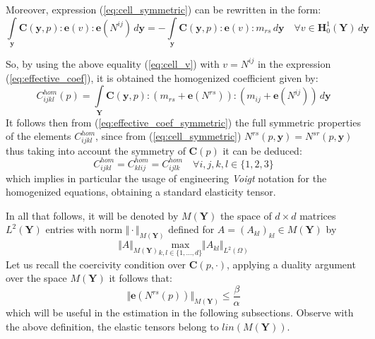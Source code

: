 Moreover, expression (\ref{eq:cell_symmetric}) can be rewritten in the form:
\begin{equation}
    \label{eq:cell_v}
    \int\limits_{\mathbf{y}}\mathbf{C}(\mathbf{y},p):\mathbf{e}(v): \mathbf{e}(N^{ij}) \, d\mathbf{y} = - \int\limits_{\mathbf{y}} \mathbf{C}(\mathbf{y},p):\mathbf{e}(v):m_{rs}\, d\mathbf{y} \quad \forall v \in \mathbf{H}^1_{0}(\mathbf{Y}) \, d\mathbf{y}
\end{equation}

So, by using the above equality (\ref{eq:cell_v}) with $v = N^{ij}$ in the expression (\ref{eq:effective_coef}), it is obtained the homogenized coefficient given by:
\begin{equation}
    \label{eq:effective_coef_symmetric}
    C_{ijkl}^{hom}(p) = \int\limits_{\mathbf{Y}} \mathbf{C}(\mathbf{y},p):(m_{rs}+\mathbf{e}(N^{rs})):(m_{ij}+\mathbf{e}(N^{ij})) \, d\mathbf{y}
\end{equation}
It follows then from (\ref{eq:effective_coef_symmetric}) the full symmetric properties of the elements $C^{hom}_{ijkl}$, since from (\ref{eq:cell_symmetric}) $N^{rs}(p,\mathbf{y}) = N^{sr}(p, \mathbf{y})$ thus taking into account the symmetry of $\mathbf{C}(p)$ it can be deduced:
\begin{equation*}
    C^{hom}_{ijkl} = C^{hom}_{klij} = C^{hom}_{ijlk} \quad \forall i,j,k,l \in \{1,2,3\}
\end{equation*}
which implies in particular the usage of engineering \textit{Voigt} notation for the homogenized equations, obtaining a standard elasticity tensor.

In all that follows, it will be denoted by $M(\mathbf{Y})$ the space of $d \times d$ matrices $L^2(\mathbf{Y})$ entries with norm $\Vert \cdot \Vert_{M(\mathbf{Y})}$ defined for $A = (A_{kl})_{kl} \in M(\mathbf{Y})$ by
\begin{equation}
    \Vert A \Vert_{M(\mathbf{Y})} \underset{k,l \in \{1,\dots, d\}}{\text{ max }} \Vert A_{kl} \Vert_{L^2(\Omega)}    
\end{equation}
Let us recall the coercivity condition over $\mathbf{C}(p, \cdot)$, applying a duality argument over the space $M(\mathbf{Y})$ it follows that:
\begin{equation}
    \label{eq:Estimate-Nrs}
    \Vert \mathbf{e}(N^{rs}(p))\Vert_{M(\mathbf{Y})} \leq \frac{\beta}{\alpha}
\end{equation}
which will be useful in the estimation in the following subsections. Observe with the above definition, the elastic tensors belong to $lin(M(\mathbf{Y}))$.
